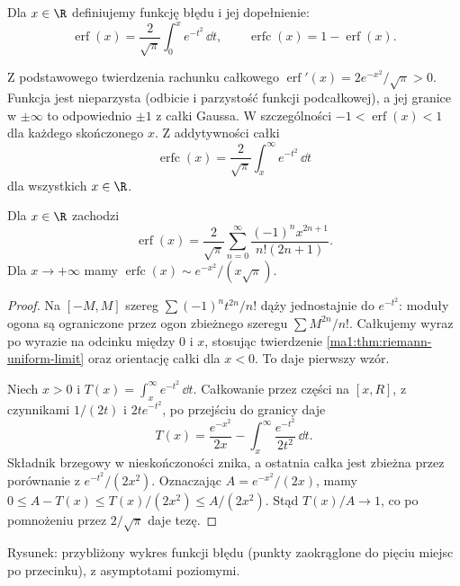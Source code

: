 \begin{definicja}
\label{ma1:def:erf}
Dla $x\in\R$ definiujemy funkcję błędu i jej dopełnienie:
\[
 \operatorname{erf}(x)=\frac2{\sqrt\pi}\int_0^x e^{-t^2}\,\dd t,
 \qquad \operatorname{erfc}(x)=1-\operatorname{erf}(x).
\]
\end{definicja}
Z podstawowego twierdzenia rachunku całkowego $\operatorname{erf}'(x)=2e^{-x^2}/\sqrt\pi>0$. Funkcja jest nieparzysta (odbicie i parzystość funkcji podcałkowej), a jej granice w $\pm\infty$ to odpowiednio $\pm1$ z całki Gaussa. W szczególności $-1<\operatorname{erf}(x)<1$ dla każdego skończonego $x$. Z addytywności całki
\[
 \operatorname{erfc}(x)=\frac2{\sqrt\pi}\int_x^\infty e^{-t^2}\,\dd t
\]
dla wszystkich $x\in\R$.
\begin{twierdzenie}
\label{ma1:thm:erf-series-tail}
Dla $x\in\R$ zachodzi
\[
 \operatorname{erf}(x)=\frac2{\sqrt\pi}
 \sum_{n=0}^\infty\frac{(-1)^n x^{2n+1}}{n!(2n+1)}.
\]
Dla $x\to+\infty$ mamy
$\operatorname{erfc}(x)\sim e^{-x^2}/(x\sqrt\pi)$.
\end{twierdzenie}
\begin{proof}
Na $[-M,M]$ szereg $\sum (-1)^nt^{2n}/n!$ dąży jednostajnie do $e^{-t^2}$: moduły ogona są ograniczone przez ogon zbieżnego szeregu $\sum M^{2n}/n!$. Całkujemy wyraz po wyrazie na odcinku między $0$ i $x$, stosując twierdzenie \ref{ma1:thm:riemann-uniform-limit} oraz orientację całki dla $x<0$. To daje pierwszy wzór.

Niech $x>0$ i $T(x)=\int_x^\infty e^{-t^2}\,\dd t$. Całkowanie przez części na $[x,R]$, z czynnikami $1/(2t)$ i $2te^{-t^2}$, po przejściu do granicy daje
\[
 T(x)=\frac{e^{-x^2}}{2x}-\int_x^\infty\frac{e^{-t^2}}{2t^2}\,\dd t.
\]
Składnik brzegowy w nieskończoności znika, a ostatnia całka jest zbieżna przez porównanie z $e^{-t^2}/(2x^2)$. Oznaczając $A=e^{-x^2}/(2x)$, mamy $0\le A-T(x)\le T(x)/(2x^2)\le A/(2x^2)$. Stąd $T(x)/A\to1$, co po pomnożeniu przez $2/\sqrt\pi$ daje tezę.
\end{proof}

\begin{center}

\small Rysunek: przybliżony wykres funkcji błędu (punkty zaokrąglone do pięciu miejsc po przecinku), z asymptotami poziomymi.
\end{center}

